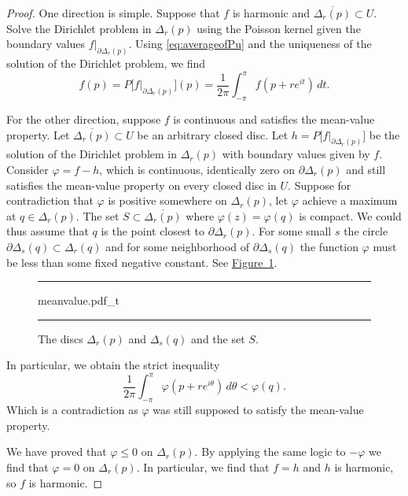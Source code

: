 \documentclass[12pt,openany]{book}
\theoremstyle{plain}
\theoremstyle{remark}
\theoremstyle{definition}
\newenvironment{myfig}{%
\begin{figure}[h!t]
\noindent\rule{\textwidth}{0.4pt}\vspace{12pt}\par\centering}%
{\par\noindent\rule{\textwidth}{0.4pt}
\end{figure}}
\theoremstyle{exercise}
\theoremstyle{example}
\newcommand{\figureref}[1]{\hyperref[#1]{Figure~\ref*{#1}}}
\begin{document}
\begin{proof}
One direction is simple.  Suppose that $f$ is harmonic and
$\overline{\Delta_r(p)} \subset U$.  Solve the
Dirichlet problem in $\Delta_r(p)$ using the Poisson kernel
given the boundary values
$f|_{\partial \Delta_r(p)}$.  Using \eqref{eq:averageofPu} and the
uniqueness of the solution of the Dirichlet problem, we find
\begin{equation*}
f(p) = P\bigl[f|_{\partial \Delta_r(p)}\big](p) =
\frac{1}{2\pi} \int_{-\pi}^{\pi}f(p + r e^{it}) \, dt .
\end{equation*}

For the other direction, suppose $f$ is continuous and satisfies the
mean-value property.  Let $\overline{\Delta_r(p)} \subset U$ be an
arbitrary closed disc.  Let $h = P\bigl[f|_{\partial \Delta_r(p)}\big]$
be the solution of the Dirichlet problem in $\Delta_r(p)$ with boundary
values given by $f$.  Consider $\varphi = f-h$,
which is continuous, identically zero
on $\partial \Delta_r(p)$ and still satisfies the mean-value property
on every closed disc in $U$.  Suppose for contradiction that $\varphi$ is positive
somewhere on $\Delta_r(p)$, let $\varphi$ achieve a maximum at $q \in
\Delta_r(p)$.
The set $S \subset \overline{\Delta_r(p)}$ where $\varphi(z) = \varphi(q)$ is compact.
We could thus assume that $q$ is the point closest to
$\partial \Delta_r(p)$.  For some small $s$ the circle
$\partial \Delta_s(q) \subset \Delta_r(q)$ and for some neighborhood
of $\partial \Delta_s(q)$ the function $\varphi$ must be less than some fixed
negative constant.  See \figureref{fig:meanvalue}.

\begin{myfig}
{meanvalue.pdf_t}
\caption{The discs $\Delta_r(p)$ and $\Delta_s(q)$ and the set
$S$.\label{fig:meanvalue}}
\end{myfig}

In particular, we obtain the strict inequality
\begin{equation*}
\frac{1}{2\pi} \int_{-\pi}^{\pi} \varphi(p+re^{i\theta})\, d\theta <
\varphi(q) .
\end{equation*}
Which is a contradiction as $\varphi$ was still supposed to satisfy the
mean-value property.

We have proved that $\varphi \leq 0$ on $\Delta_r(p)$.  By applying the same
logic to $-\varphi$ we find that $\varphi = 0$ on $\Delta_r(p)$.  In
particular, we find that $f=h$ and $h$ is harmonic, so $f$ is harmonic.
\end{proof}
\end{document}
